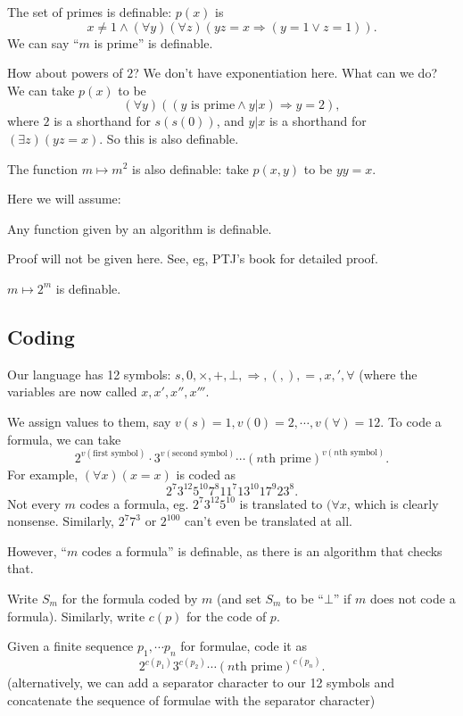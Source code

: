 \documentclass[a4paper]{article}
\begin{document}
\begin{eg}
  The set of primes is definable: $p(x)$ is
  \[
    x\not = 1 \wedge (\forall y)(\forall z)(yz = x \Rightarrow (y = 1\vee z = 1)).
  \]
  We can say ``$m$ is prime'' is definable.

  How about powers of $2$? We don't have exponentiation here. What can we do? We can take $p(x)$ to be
  \[
    (\forall y)((y\text{ is prime}\wedge y | x) \Rightarrow  y = 2),
  \]
  where $2$ is a shorthand for $s(s(0))$, and $y|x$ is a shorthand for $(\exists z)(yz = x)$. So this is also definable.

  The function $m\mapsto m^2$ is also definable: take $p(x, y)$ to be $yy = x$.
\end{eg}

Here we will assume:
\begin{fact}
  Any function given by an algorithm is definable.
\end{fact}
Proof will not be given here. See, eg, PTJ's book for detailed proof.

\begin{eg}
  $m\mapsto 2^m$ is definable.
\end{eg}

\subsection*{Coding}
Our language has 12 symbols: $s, 0, \times, +, \bot, \Rightarrow, (, ), =, x, ', \forall$ (where the variables are now called $x, x', x'', x'''$.

We assign values to them, say $v(s) = 1, v(0) = 2, \cdots, v(\forall) = 12$. To code a formula, we can take
\[
  2^{v(\text{first symbol})}\cdot 3^{v(\text{second symbol})}\cdots (n\text{th prime})^{v(n\text{th symbol})}.
\]
For example, $(\forall x)(x = x)$ is coded as
\[
  2^7 3^{12}5^{10}7^8 11^7 13^{10}17^9 23^8.
\]
Not every $m$ codes a formula, eg. $2^7 3^{12}5^{10}$ is translated to $(\forall x$, which is clearly nonsense. Similarly, $2^7 7^3$ or $2^{100}$ can't even be translated at all.

However, ``$m$ codes a formula'' is definable, as there is an algorithm that checks that.

Write $S_m$ for the formula coded by $m$ (and set $S_m$ to be ``$\bot$'' if $m$ does not code a formula). Similarly, write $c(p)$ for the code of $p$.

Given a finite sequence $p_1, \cdots p_n$ for formulae, code it as
\[
  2^{c(p_1)}3^{c(p_2)}\cdots (n\text{th prime})^{c(p_n)}.
\]
(alternatively, we can add a separator character to our 12 symbols and concatenate the sequence of formulae with the separator character)
\end{document}
